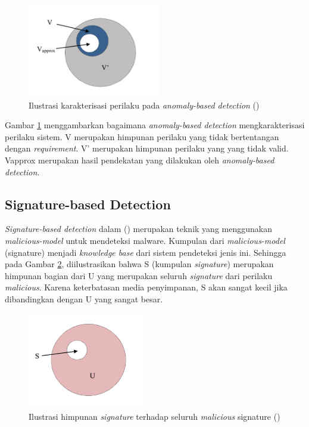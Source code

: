 \begin{figure}[H]
	\centering
	\includegraphics[width=220px]{resources/anomaly_illustration.png}
	\caption{Ilustrasi karakterisasi perilaku pada \textit{anomaly-based detection} (\cite{idika2007survey})}
	\label{fig:anomaly_illust}
\end{figure}

Gambar \ref{fig:anomaly_illust} menggambarkan bagaimana \textit{anomaly-based detection} mengkarakterisasi perilaku sistem. V merupakan himpunan perilaku yang tidak bertentangan dengan \textit{requirement}. V’ merupakan himpunan perilaku yang yang tidak valid. Vapprox merupakan hasil pendekatan yang dilakukan oleh \textit{anomaly-based detection}.

\subsection{Signature-based Detection}
\textit{Signature-based detection} dalam (\cite{idika2007survey}) merupakan teknik yang menggunakan \textit{malicious-model} untuk mendeteksi malware. Kumpulan dari \textit{malicious-model} (signature) menjadi \textit{knowledge base} dari sistem pendeteksi jenis ini. Sehingga pada Gambar \ref{fig:signature_illust}, diilustrasikan bahwa S (kumpulan \textit{signature}) merupakan himpunan bagian dari U yang merupakan seluruh \textit{signature} dari perilaku \textit{malicious}. Karena keterbatasan media penyimpanan, S akan sangat kecil jika dibandingkan dengan U yang sangat besar.

\begin{figure}[H]
	\centering
	\includegraphics[width=190px]{resources/signature_illustration.png}
	\caption{Ilustrasi himpunan \textit{signature} terhadap seluruh \textit{malicious} signature (\cite{idika2007survey})}
	\label{fig:signature_illust}
\end{figure}

